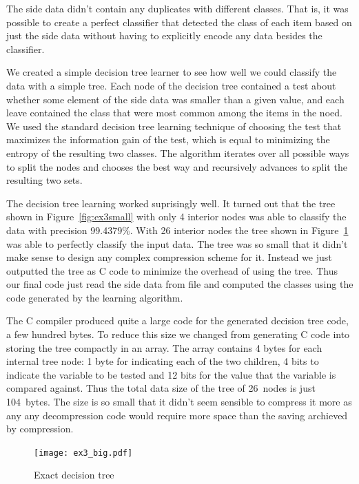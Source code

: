 \documentclass{article}
\begin{document}
The side data didn't contain any duplicates with different classes.
That is, it was possible to create a perfect classifier that detected the class of each item based on just the side data without having to explicitly encode any data besides the classifier.

We created a simple decision tree learner to see how well we could classify the data with a simple tree.
Each node of the decision tree contained a test about whether some element of the side data was smaller than a given value, and each leave contained the class that were most common among the items in the noed.
We used the standard decision tree learning technique of choosing the test that maximizes the information gain of the test, which is equal to minimizing the entropy of the resulting two classes.
The algorithm iterates over all possible ways to split the nodes and chooses the best way and recursively advances to split the resulting two sets.

The decision tree learning worked suprisingly well.
It turned out that the tree shown in Figure~\ref{fig:ex3small} with only 4 interior nodes was able to classify the data with precision 99.4379\%.
With 26 interior nodes the tree shown in Figure~\ref{fig:ex3big} was able to perfectly classify the input data.
The tree was so small that it didn't make sense to design any complex compression scheme for it.
Instead we just outputted the tree as C code to minimize the overhead of using the tree.
Thus our final code just read the side data from file and computed the classes using the code generated by the learning algorithm.

The C compiler produced quite a large code for the generated decision tree code, a few hundred bytes.
To reduce this size we changed from generating C code into storing the tree compactly in an array.
The array contains 4 bytes for each internal tree node: 1 byte for indicating each of the two children, 4 bits to indicate the variable to be tested and 12 bits for the value that the variable is compared against.
Thus the total data size of the tree of 26~nodes is just 104~bytes.
The size is so small that it didn't seem sensible to compress it more as any any decompression code would require more space than the saving archieved by compression.

\begin{figure}
	\centerline{\texttt{[image: ex3\_big.pdf]}}
    \caption{Exact decision tree}\label{fig:ex3big}
\end{figure}
\end{document}
